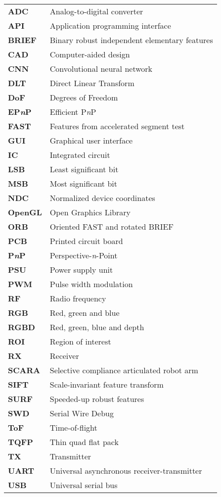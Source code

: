 \begin{tabular}{p{3cm}l}
  	\textbf{ADC}			& Analog-to-digital converter \\
  	\textbf{API}			& Application programming interface \\
  	\textbf{BRIEF}			& Binary robust independent elementary features \\
  	\textbf{CAD}			& Computer-aided design \\
	\textbf{CNN} 			& Convolutional neural network \\
	\textbf{DLT}			& Direct Linear Transform \\
	\textbf{DoF}			& Degrees of Freedom \\
	\textbf{EP\textit{n}P}	& Efficient P\textit{n}P \\
	\textbf{FAST}			& Features from accelerated segment test \\
	\textbf{GUI}			& Graphical user interface \\
	\textbf{IC}				& Integrated circuit \\	
	\textbf{LSB}			& Least significant bit \\
	\textbf{MSB}			& Most significant bit \\
	\textbf{NDC}			& Normalized device coordinates \\
	\textbf{OpenGL}			& Open Graphics Library \\
	\textbf{ORB}			& Oriented FAST and rotated BRIEF \\
	\textbf{PCB}			& Printed circuit board \\
	\textbf{P\textit{n}P}	& Perspective-\textit{n}-Point \\
	\textbf{PSU}			& Power supply unit \\
	\textbf{PWM}			& Pulse width modulation \\
	\textbf{RF}				& Radio frequency \\
	\textbf{RGB}			& Red, green and blue \\
	\textbf{RGBD}			& Red, green, blue and depth \\
	\textbf{ROI}			& Region of interest \\
	\textbf{RX}				& Receiver \\
	\textbf{SCARA}			& Selective compliance articulated robot arm \\
	\textbf{SIFT}			& Scale-invariant feature transform \\
	\textbf{SURF}			& Speeded-up robust features \\
	\textbf{SWD}			& Serial Wire Debug \\
	\textbf{ToF}			& Time-of-flight \\
	\textbf{TQFP}			& Thin quad flat pack \\
	\textbf{TX}				& Transmitter \\
	\textbf{UART} 			& Universal asynchronous receiver-transmitter \\
	\textbf{USB}			& Universal serial bus
	

\end{tabular}

